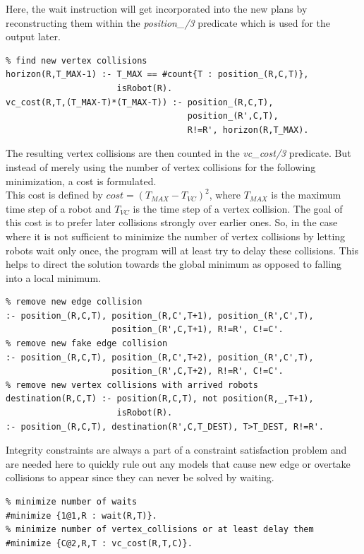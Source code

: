 \documentclass{llncs}
\begin{document}
Here, the wait instruction will get incorporated into the new plans by reconstructing them within the \emph{position\_/3} predicate which is used for the output later.

\begin{verbatim}
% find new vertex collisions
horizon(R,T_MAX-1) :- T_MAX == #count{T : position_(R,C,T)},
                      isRobot(R).
vc_cost(R,T,(T_MAX-T)*(T_MAX-T)) :- position_(R,C,T), 
                                    position_(R',C,T),
                                    R!=R', horizon(R,T_MAX).
\end{verbatim}

The resulting vertex collisions are then counted in the \emph{vc\_cost/3} predicate. But instead of merely using the number of vertex collisions for the following minimization, a cost is formulated.\\ This cost is defined by $cost = (T_{MAX} - T_{VC})^2$, where $T_{MAX}$ is the maximum time step of a robot and $T_{VC}$ is the time step of a vertex collision. The goal of this cost is to prefer later collisions strongly over earlier ones. So, in the case where it is not sufficient to minimize the number of vertex collisions by letting robots wait only once, the program will at least try to delay these collisions.
This helps to direct the solution towards the global minimum as opposed to falling into a local minimum.

\begin{verbatim}
% remove new edge collision
:- position_(R,C,T), position_(R,C',T+1), position_(R',C',T),
                     position_(R',C,T+1), R!=R', C!=C'.
% remove new fake edge collision
:- position_(R,C,T), position_(R,C',T+2), position_(R',C',T),
                     position_(R',C,T+2), R!=R', C!=C'.
% remove new vertex collisions with arrived robots
destination(R,C,T) :- position(R,C,T), not position(R,_,T+1),
                      isRobot(R).
:- position_(R,C,T), destination(R',C,T_DEST), T>T_DEST, R!=R'.
\end{verbatim}

Integrity constraints are always a part of a constraint satisfaction problem and are needed here to quickly rule out any models that cause new edge or overtake collisions to appear since they can never be solved by waiting.

\begin{verbatim}
% minimize number of waits
#minimize {1@1,R : wait(R,T)}.
% minimize number of vertex_collisions or at least delay them
#minimize {C@2,R,T : vc_cost(R,T,C)}.
\end{verbatim}
\end{document}
